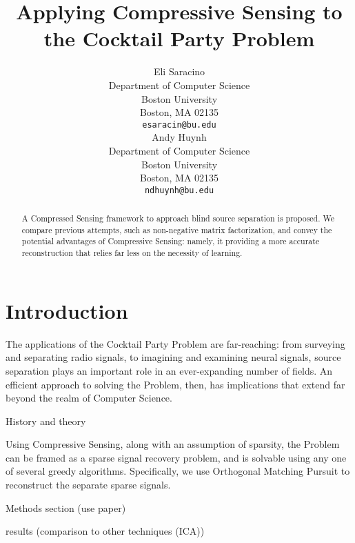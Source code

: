 \documentclass{article}
\title{Applying Compressive Sensing to the Cocktail Party Problem}
\author{
  Eli Saracino \\
  Department of Computer Science\\
  Boston University\\
  Boston, MA 02135 \\
  \texttt{esaracin@bu.edu} \\
  \And
  Andy Huynh \\
  Department of Computer Science \\
  Boston University \\
  Boston, MA 02135 \\
  \texttt{ndhuynh@bu.edu} \\
}
\begin{document}
\maketitle

\begin{abstract}
  A Compressed Sensing framework to approach blind source separation is proposed. We compare previous attempts, such as non-negative matrix factorization, and convey the potential advantages of Compressive Sensing: namely, it providing a more accurate reconstruction that relies far less on the necessity of learning.
\end{abstract}

\section{Introduction}
The applications of the Cocktail Party Problem are far-reaching: from surveying and separating radio signals, to imagining and examining neural signals, source separation plays an important role in an ever-expanding number of fields. An efficient approach to solving the Problem, then, has implications that extend far beyond the realm of Computer Science. 

History and theory

Using Compressive Sensing, along with an assumption of sparsity, the Problem can be framed as a sparse signal recovery problem, and is solvable using any one of several greedy algorithms. Specifically, we use Orthogonal Matching Pursuit to reconstruct the separate sparse signals.


Methods section (use paper)

results (comparison to other techniques (ICA))
\end{document}
